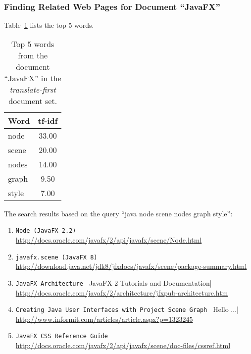 \subsubsection{Finding Related Web Pages for Document ``JavaFX''}
\label{subsubsec:no-javafx-2}

Table~\ref{tab:topWords-en-javafx-2} lists the top 5 words.
\begin{table}[H]
\centering
\begin{tabular}{|l|c|}
\hline\hline
    Word & tf-idf \\
\hline
    node & 33.00 \\
    scene & 20.00 \\
    nodes & 14.00 \\
    graph & 9.50 \\
    style & 7.00 \\
\hline\hline
\end{tabular}
\caption{Top 5 words from the document ``JavaFX'' in the \textit{translate-first} document set.}
\label{tab:topWords-en-javafx-2}
\end{table}

The search results based on the query ``java node scene nodes graph style'':

\begin{enumerate}
\item
    \verb|Node (JavaFX 2.2)| \\
    \url{http://docs.oracle.com/javafx/2/api/javafx/scene/Node.html}
\item
    \verb|javafx.scene (JavaFX 8)| \\
    \url{http://download.java.net/jdk8/jfxdocs/javafx/scene/package-summary.html}
\item
    \verb|JavaFX Architecture | JavaFX 2 Tutorials and Documentation| \\
    \url{http://docs.oracle.com/javafx/2/architecture/jfxpub-architecture.htm}
\item
    \verb|Creating Java User Interfaces with Project Scene Graph | Hello ...| \\
    \url{http://www.informit.com/articles/article.aspx?p=1323245}
\item
    \verb|JavaFX CSS Reference Guide| \\
    \url{http://docs.oracle.com/javafx/2/api/javafx/scene/doc-files/cssref.html}
\end{enumerate}

